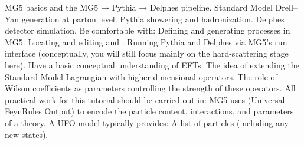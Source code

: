 \markdownRendererUlItem MG5 basics and the MG5 → Pythia → Delphes pipeline.\markdownRendererUlItemEnd 
\markdownRendererUlItem Standard Model Drell–Yan generation at parton level.\markdownRendererUlItemEnd 
\markdownRendererUlItem Pythia showering and hadronization.\markdownRendererUlItemEnd 
\markdownRendererUlItem Delphes detector simulation.\markdownRendererUlItemEnd 
\markdownRendererUlEndTight \markdownRendererUlItemEnd 
\markdownRendererUlItem Be comfortable with:\markdownRendererInterblockSeparator
{}\markdownRendererUlBeginTight
\markdownRendererUlItem Defining and generating processes in MG5.\markdownRendererUlItemEnd 
\markdownRendererUlItem Locating and editing  and .\markdownRendererUlItemEnd 
\markdownRendererUlItem Running Pythia and Delphes via MG5’s run interface (conceptually, you will still focus mainly on the hard-scattering stage here).\markdownRendererUlItemEnd 
\markdownRendererUlEndTight \markdownRendererUlItemEnd 
\markdownRendererUlItem Have a basic conceptual understanding of EFTs:\markdownRendererInterblockSeparator
{}\markdownRendererUlBeginTight
\markdownRendererUlItem The idea of extending the Standard Model Lagrangian with higher-dimensional operators.\markdownRendererUlItemEnd 
\markdownRendererUlItem The role of Wilson coefficients as parameters controlling the strength of these operators.\markdownRendererUlItemEnd 
\markdownRendererUlEndTight \markdownRendererUlItemEnd 
\markdownRendererUlEndTight \markdownRendererInterblockSeparator
{}All practical work for this tutorial should be carried out in:\markdownRendererInterblockSeparator
{}\markdownRendererUlBeginTight
\markdownRendererUlItem {}\markdownRendererUlItemEnd 
\markdownRendererUlEndTight \markdownRendererInterblockSeparator
{}\markdownRendererThematicBreak{}\markdownRendererInterblockSeparator
{}
\markdownRendererSectionEnd \markdownRendererSectionBegin
{}\markdownRendererInterblockSeparator
{}MG5 uses  (Universal FeynRules Output) to encode the particle content, interactions, and parameters of a theory. A UFO model typically provides:\markdownRendererInterblockSeparator
{}\markdownRendererUlBeginTight
\markdownRendererUlItem A list of particles (including any new states).\markdownRendererUlItemEnd 
